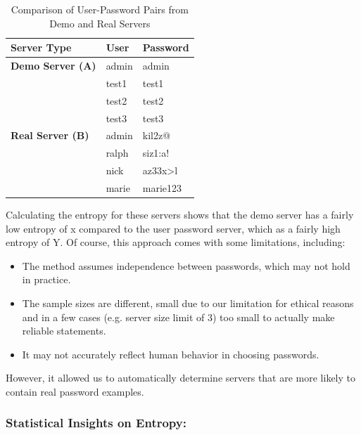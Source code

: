 \begin{table}[h]
\centering
\begin{tabular}{@{}lll@{}}
\toprule
\textbf{Server Type} & \textbf{User} & \textbf{Password} \\ \midrule
\textbf{Demo Server (A)} & admin         & admin             \\
                         & test1         & test1             \\
                         & test2         & test2             \\
                         & test3         & test3             \\ \midrule
\textbf{Real Server (B)} & admin         & kil2z@            \\
                         & ralph         & siz1:a!           \\
                         & nick          & az33x>l           \\
                         & marie         & marie123          \\ \bottomrule
\end{tabular}
\caption{Comparison of User-Password Pairs from Demo and Real Servers}
\end{table}

Calculating the entropy for these servers shows that the demo server has a fairly low entropy of x compared to the user password server, which as a fairly high entropy of Y. Of course, this approach comes with some limitations, including:

\begin{itemize}
    \item The method assumes independence between passwords, which may not hold in practice.
    \item The sample sizes are different, small due to our limitation for ethical reasons and in a few cases (e.g. server size limit of 3) too small to actually make reliable statements.
    \item It may not accurately reflect human behavior in choosing passwords.
\end{itemize}

However, it allowed us to automatically determine servers that are more likely to contain real password examples.

\subsubsection{Statistical Insights on Entropy:}

